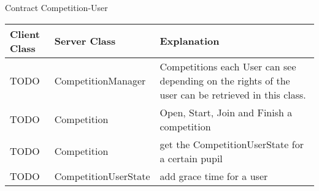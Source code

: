 \begin{subsubsection}{Contract Competition-User}
	\begin{tabular}{l l l }
	  Client Class & Server Class & Explanation\\ \hline
	  TODO & CompetitionManager & Competitions each User can see depending on the rights
	  of the user can be retrieved in this class.\\
	  TODO & Competition & Open, Start, Join and Finish a competition\\
	  TODO & Competition & get the CompetitionUserState for a certain pupil\\
	  TODO & CompetitionUserState & add grace time for a user\\
	\end{tabular}
\end{subsubsection}